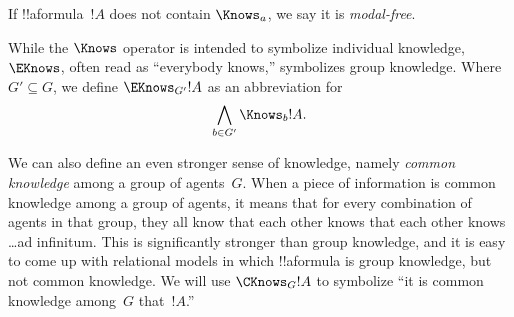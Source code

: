 \documentclass[../../../include/open-logic-section]{subfiles}
\begin{document}
If !!a{formula}~$!A$ does not contain $\Knows_a$, we say it
is \emph{modal-free}.

\begin{defn}
  While the $\Knows$ operator is intended to symbolize individual
  knowledge, $\EKnows$, often read as ``everybody knows,'' symbolizes
  group knowledge. Where $G' \subseteq G$, we define $\EKnows_{G'} !A$
 as an abbreviation for \[\bigwedge_{b \in G'} \Knows_b !A.\]
\end{defn}

We can also define an even stronger sense of knowledge, namely
\emph{common knowledge} among a group of agents~$G$. When a piece of
information is common knowledge among a group of agents, it means that
for every combination of agents in that group, they all know that each
other knows that each other knows \dots ad infinitum. This is
significantly stronger than group knowledge, and it is easy to come up
with relational models in which !!a{formula} is group knowledge, but
not common knowledge. We will use $\CKnows_G !A$ to symbolize ``it is
common knowledge among~$G$ that~$!A$.''
\end{document}
